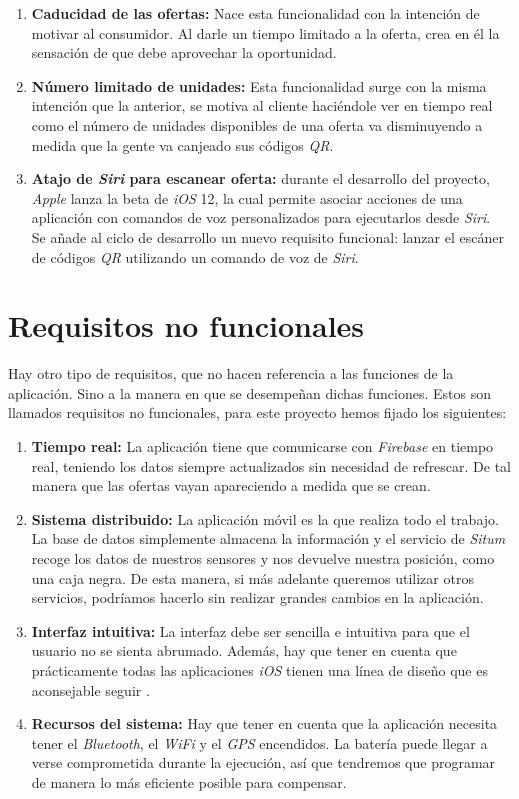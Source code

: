 \begin{enumerate}
\item \textbf{Caducidad de las ofertas:} Nace esta funcionalidad con la intención de motivar al consumidor. Al darle un tiempo limitado a la oferta, crea en él la sensación de que debe aprovechar la oportunidad.
\item \textbf{Número limitado de unidades:} Esta funcionalidad surge con la misma intención que la anterior, se motiva al cliente haciéndole ver en tiempo real como el número de unidades disponibles de una oferta va disminuyendo a medida que la gente va canjeado sus códigos \textit{QR}.
\item \textbf{Atajo de \textit{Siri} para escanear oferta:} durante el desarrollo del proyecto, \textit{Apple} lanza la beta de \textit{iOS} 12, la cual permite asociar acciones de una aplicación con comandos de voz personalizados para ejecutarlos desde \textit{Siri}.\\Se añade al ciclo de desarrollo un nuevo requisito funcional: lanzar el escáner de códigos \textit{QR} utilizando un comando de voz de \textit{Siri}.
\end{enumerate}
\section{Requisitos no funcionales}
Hay otro tipo de requisitos, que no hacen referencia a las funciones de la aplicación. Sino a la manera en que se desempeñan dichas funciones. Estos son llamados requisitos no funcionales, para este proyecto hemos fijado los siguientes:
\begin{enumerate}
\item \textbf{Tiempo real:} La aplicación tiene que comunicarse con \textit{Firebase} en tiempo real, teniendo los datos siempre actualizados sin necesidad de refrescar. De tal manera que las ofertas vayan apareciendo a medida que se crean.
\item \textbf{Sistema distribuido:} La aplicación móvil es la que realiza todo el trabajo. La base de datos simplemente almacena la información y el servicio de \textit{Situm} recoge los datos de nuestros sensores y nos devuelve nuestra posición, como una caja negra. De esta manera, si más adelante queremos utilizar otros servicios, podríamos hacerlo sin realizar grandes cambios en la aplicación.
\item \textbf{Interfaz intuitiva:} La interfaz debe ser sencilla e intuitiva para que el usuario no se sienta abrumado. Además, hay que tener en cuenta que prácticamente todas las aplicaciones \textit{iOS} tienen una línea de diseño que es aconsejable seguir \cite{noauthor_ios_nodate} .
\item \textbf{Recursos del sistema:} Hay que tener en cuenta que la aplicación necesita tener el \textit{Bluetooth}, el \textit{WiFi} y el \textit{GPS} encendidos. La batería puede llegar a verse comprometida durante la ejecución, así que tendremos que programar de manera lo más eficiente posible para compensar.
\end{enumerate}
